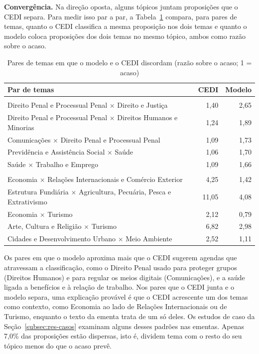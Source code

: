 \textbf{Convergência.} Na direção oposta, alguns tópicos juntam proposições que o CEDI separa. Para medir isso par a par, a Tabela~\ref{tab:pares} compara, para pares de temas, quanto o CEDI classifica a mesma proposição nos dois temas e quanto o modelo coloca proposições dos dois temas no mesmo tópico, ambos como razão sobre o acaso.

\begin{table}[H]
\centering
\caption{Pares de temas em que o modelo e o CEDI discordam (razão sobre o acaso; 1 = acaso)}
\label{tab:pares}
\small
\begin{tabularx}{\textwidth}{>{\raggedright\arraybackslash}X r r}
\toprule
\textbf{Par de temas} & \textbf{CEDI} & \textbf{Modelo} \\
\midrule
\multicolumn{3}{l}{\textit{O modelo aproxima temas que o CEDI raramente classifica juntos}} \\
Direito Penal e Processual Penal $\times$ Direito e Justiça & 1,40 & 2,65 \\
Direito Penal e Processual Penal $\times$ Direitos Humanos e Minorias & 1,24 & 1,89 \\
Comunicações $\times$ Direito Penal e Processual Penal & 1,09 & 1,73 \\
Previdência e Assistência Social $\times$ Saúde & 1,06 & 1,70 \\
Saúde $\times$ Trabalho e Emprego & 1,09 & 1,66 \\
\midrule
\multicolumn{3}{l}{\textit{O CEDI classifica juntos temas que o modelo separa}} \\
Economia $\times$ Relações Internacionais e Comércio Exterior & 4,25 & 1,42 \\
Estrutura Fundiária $\times$ Agricultura, Pecuária, Pesca e Extrativismo & 11,05 & 4,08 \\
Economia $\times$ Turismo & 2,12 & 0,79 \\
Arte, Cultura e Religião $\times$ Turismo & 6,82 & 2,98 \\
Cidades e Desenvolvimento Urbano $\times$ Meio Ambiente & 2,52 & 1,11 \\
\bottomrule
\end{tabularx}
\end{table}

Os pares em que o modelo aproxima mais que o CEDI sugerem agendas que atravessam a classificação, como o Direito Penal usado para proteger grupos (Direitos Humanos) e para regular os meios digitais (Comunicações), e a saúde ligada a benefícios e à relação de trabalho. Nos pares que o CEDI junta e o modelo separa, uma explicação provável é que o CEDI acrescente um dos temas como contexto, como Economia ao lado de Relações Internacionais ou de Turismo, enquanto o texto da ementa trata de um só deles. Os estudos de caso da Seção~\ref{subsec:res-casos} examinam alguns desses padrões nas ementas. Apenas 7,0\% das proposições estão dispersas, isto é, dividem tema com o resto do seu tópico menos do que o acaso prevê.

